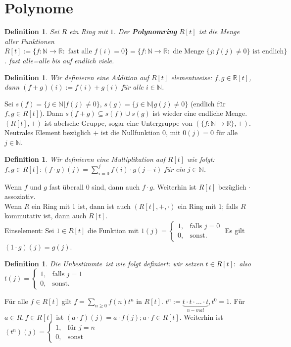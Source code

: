 \documentclass[12pt,a4paper]{article}
\theoremstyle{plain}
\newtheorem{Definition}[Theorem]{Definition}
\newcommand{\N}{\mathbb{N}}
\newcommand{\R}{\mathbb{R}}
\numberwithin{equation}{section}
\begin{document}
\section{Polynome}
\begin{Definition}
Sei $R$ ein Ring mit $1$. Der \textbf{Polynomring} $R[t]$ ist die Menge aller Funktionen $R[t]:=\{f:\N\rightarrow\R:\text{ fast alle }f(i)=0\}=\{f:\N\rightarrow\R:\text{ die Menge }\{j:f(j)\neq 0\}\text{ ist endlich}\}$. \glqq fast alle\grqq=\glqq alle bis auf endlich viele\grqq. 
\end{Definition}
\begin{Definition}
Wir definieren eine Addition auf $R[t]$ elementweise: $f,g\in\R[t]$, dann $(f+g)(i):=f(i)+g(i)$ für alle $i\in\N$. 
\end{Definition}
Sei $s(f)=\{j\in\N|f(j)\neq 0\}$, $s(g)=\{j\in\N|g(j)\neq 0\}$ (endlich für $f,g\in R[t]$). Dann $s(f+g)\subseteq s(f)\cup s(g)$ ist wieder eine endliche Menge. \\
$(R[t],+)$ ist abelsche Gruppe, sogar eine Untergruppe von $(\{f:\N\rightarrow\R\},+)$. Neutrales Element bezüglich $+$ ist die Nullfunktion $0$, mit $0(j)=0$ für alle $j\in\N$.
\begin{Definition}
Wir definieren eine Multiplikation auf $R[t]$ wie folgt: $f,g\in R[t]: (f\cdot g)(j)=\sum_{i=0}^j{f(i)\cdot g(j-i)}$ für ein $j\in\N$. 
\end{Definition} Wenn $f$ und $g$ fast überall $0$ sind, dann auch $f\cdot g$. Weiterhin ist $R[t]$ bezüglich $\cdot$ assoziativ.\\
Wenn $R$ ein Ring mit $1$ ist, dann ist auch $(R[t],+,\cdot)$ ein Ring mit $1$; falls $R$ kommutativ ist, dann auch $R[t]$.\\
Einselement: Sei $1\in R[t]$ die Funktion mit $1(j)=\left\lbrace\begin{array}{ll}1,&\text{falls }j=0\\
0,&\text{sonst.}
\end{array}\right.$ Es gilt $(1\cdot g)(j)=g(j)$.
\begin{Definition}
Die \glqq Unbestimmte\grqq\ ist wie folgt definiert: wir setzen $t\in R[t]:$ also $t(j)=\left\lbrace\begin{array}{ll}1,&\text{falls }j=1\\
0,&\text{sonst.}
\end{array}\right.$ 
\end{Definition}
Für alle $f\in R[t]$ gilt $f=\sum_{n\geq 0}{f(n)t^n}$ in $R[t]$. $t^n:=\underbrace{t\cdot t\cdot\ldots\cdot t}_{n-mal},t^0=1$. Für $a\in R, f\in R[t]$ ist $(a\cdot f)(j)=a\cdot f(j); a\cdot f\in R[t]$. Weiterhin ist $(t^n)(j)=\left\lbrace\begin{array}{ll}1,&\text{für }j=n\\0,&\text{sonst}\end{array}\right.$\\
\end{document}
